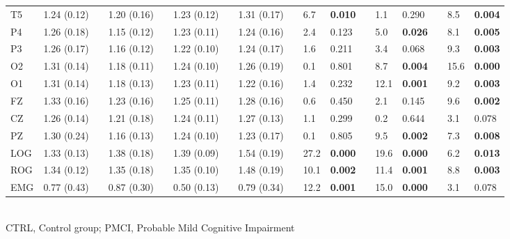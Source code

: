 \documentclass[10pt]{article}
\begin{document}
\begin{table}
\begin{small}
\begin{tabular}{lllllllllllllllll}
T5&1.24 (0.12) &&1.20 (0.16) &&1.23 (0.12) &&1.31 (0.17) &&6.7 &\bf 0.010&&1.1&0.290&&8.5&\bf 0.004
 \\
P4&1.26 (0.18) &&1.15 (0.12) &&1.23 (0.11) &&1.24 (0.16) &&2.4 &    0.123&&5.0&\bf 0.026&&8.1&\bf 0.005
 \\
P3&1.26 (0.17) &&1.16 (0.12) &&1.22 (0.10) &&1.24 (0.17) &&1.6 &    0.211&&3.4&0.068&&9.3&\bf 0.003
 \\
O2&1.31 (0.14) &&1.18 (0.11) &&1.24 (0.10) &&1.26 (0.19) &&0.1 &    0.801&&8.7&\bf 0.004&&15.6&\bf 0.000
 \\
O1&1.31 (0.14) &&1.18 (0.13) &&1.23 (0.11) &&1.22 (0.16) &&1.4 &    0.232&&12.1&\bf 0.001&&9.2&\bf 0.003
 \\
FZ&1.33 (0.16) &&1.23 (0.16) &&1.25 (0.11) &&1.28 (0.16) &&0.6 &    0.450&&2.1&0.145&&9.6&\bf 0.002
 \\
CZ&1.26 (0.14) &&1.21 (0.18) &&1.24 (0.11) &&1.27 (0.13) &&1.1 &    0.299&&0.2&0.644&&3.1&0.078
 \\
PZ&1.30 (0.24) &&1.16 (0.13) &&1.24 (0.10) &&1.23 (0.17) &&0.1 &    0.805&&9.5&\bf 0.002&&7.3&\bf 0.008
 \\
LOG&1.33 (0.13) &&1.38 (0.18) &&1.39 (0.09) &&1.54 (0.19) &&27.2&\bf 0.000&&19.6&\bf 0.000&&6.2&\bf 0.013
 \\
ROG&1.34 (0.12) &&1.35 (0.18) &&1.35 (0.10) &&1.48 (0.19) &&10.1&\bf 0.002&&11.4&\bf 0.001&&8.8&\bf 0.003
 \\
EMG&0.77 (0.43) &&0.87 (0.30) &&0.50 (0.13) &&0.79 (0.34) &&12.2&\bf 0.001&&15.0&\bf 0.000&&3.1&0.078
 \\
\bottomrule
\end{tabular}\\
CTRL, Control group; PMCI, Probable Mild Cognitive Impairment
\end{small}
\end{table}
\end{document}
